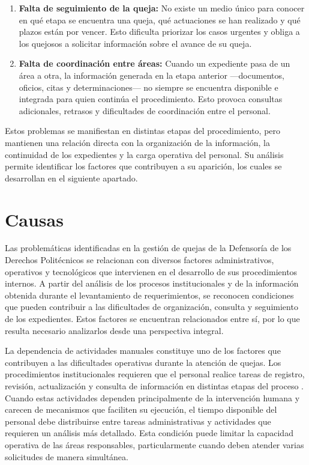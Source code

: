 \begin{enumerate}
		\item \label{pe:estado}\textbf{Falta de seguimiento de la queja:}
		No existe un medio único para conocer en qué etapa se encuentra una queja, qué actuaciones se han realizado y qué plazos están por vencer. Esto dificulta priorizar los casos urgentes y obliga a los quejosos a solicitar información sobre el avance de su queja.

		\item \label{pe:informacion}\textbf{Falta de coordinación entre áreas:}
		Cuando un expediente pasa de un área a otra, la información generada en la etapa anterior ---documentos, oficios, citas y determinaciones--- no siempre se encuentra disponible e integrada para quien continúa el procedimiento. Esto provoca consultas adicionales, retrasos y dificultades de coordinación entre el personal.

	\end{enumerate}

	Estos problemas se manifiestan en distintas etapas del procedimiento, pero mantienen una relación directa con la organización de la información, la continuidad de los expedientes y la carga operativa del personal. Su análisis permite identificar los factores que contribuyen a su aparición, los cuales se desarrollan en el siguiente apartado.

	\section{Causas}
	Las problemáticas identificadas en la gestión de quejas de la Defensoría de los Derechos Politécnicos se relacionan con diversos factores administrativos, operativos y tecnológicos que intervienen en el desarrollo de sus procedimientos internos. A partir del análisis de los procesos institucionales y de la información obtenida durante el levantamiento de requerimientos, se reconocen condiciones que pueden contribuir a las dificultades de organización, consulta y seguimiento de los expedientes. Estos factores se encuentran relacionados entre sí, por lo que resulta necesario analizarlos desde una perspectiva integral.

	La dependencia de actividades manuales constituye uno de los factores que contribuyen a las dificultades operativas durante la atención de quejas. Los procedimientos institucionales requieren que el personal realice tareas de registro, revisión, actualización y consulta de información en distintas etapas del proceso \cite{ipn_manual_procedimientos_ddp}. Cuando estas actividades dependen principalmente de la intervención humana y carecen de mecanismos que faciliten su ejecución, el tiempo disponible del personal debe distribuirse entre tareas administrativas y actividades que requieren un análisis más detallado. Esta condición puede limitar la capacidad operativa de las áreas responsables, particularmente cuando deben atender varias solicitudes de manera simultánea.

